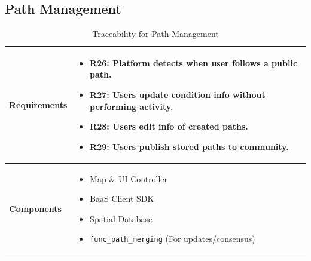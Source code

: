 \subsection{Path Management}
\begin{table}[H]
    \centering
    \renewcommand{\arraystretch}{1.5}
    \begin{tabular}{|p{}|p{}|}
        \hline
        \textbf{Requirements} & 
        \begin{itemize}[nosep, leftmargin=*, label={}, before=\vspace{-0.6\baselineskip}, after=\strut]
            \item \textbf{R26:} Platform detects when user follows a public path.
            \item \textbf{R27:} Users update condition info without performing activity.
            \item \textbf{R28:} Users edit info of created paths.
            \item \textbf{R29:} Users publish stored paths to community.
        \end{itemize} \\
        \hline
        \textbf{Components} & 
        \begin{itemize}[nosep, leftmargin=*, before=\vspace{-0.6\baselineskip}, after=\strut]
            \item Map \& UI Controller
            \item BaaS Client SDK
            \item Spatial Database
            \item \texttt{func\_path\_merging} (For updates/consensus)
        \end{itemize} \\
        \hline
    \end{tabular}
    \caption{Traceability for Path Management}
\end{table}